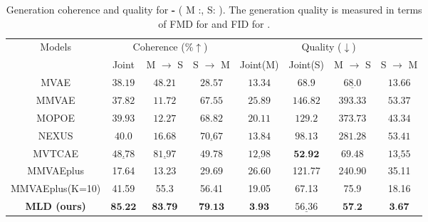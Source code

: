 \begin{table}[h]
\caption{Generation coherence and quality for \textbf{\mnist-\svhn} ( M :\mnist, S: \svhn ). The generation quality is measured in terms of \gls{FMD}  for \mnist and \gls{FID} for \svhn.}
\centering
\tiny
\begin{tabular}{c|c|cc|cc|cc}
\toprule
\multirow{2}{*}{ Models }  & \multicolumn{3}{c}{Coherence (\%$\uparrow$) } &   \multicolumn{4}{c}{Quality ($\downarrow$)} \\
    \cmidrule{2-8}
    & Joint &  M $\rightarrow$ S & S $\rightarrow$ M &
     Joint(M)  &  Joint(S) &M $\rightarrow$ S &  S $\rightarrow$ M  \\
    \midrule
     \gls{MVAE} &  
     $38.19$ &
     $48.21$  &
     $ 28.57$ & 
     $13.34$ &
     $68.9$   & 
     $ \underline{68.0}  $ &
     $ 13.66 $ 
    
     \\
    \gls{MMVAE} &  $37.82$ & $11.72$ & $ 67.55$ & $25.89$ &
    $ 146.82  $& $393.33$  &
    $ 53.37 $ 
 
    \\
    \gls{MOPOE} & $ 39.93$ & $12.27$ & $68.82$ &$20.11$ &
    $ 129.2  $&$373.73$&
    $ 43.34 $
        \\

    \gls{NEXUS} &  $ 40.0$ & $16.68$ & $\underline{70.67}$ &  $13.84$ &
        $ 98.13  $ &$281.28$&
 $ 53.41 $
   \\


    \gls{MVTCAE} & $\underline{48.78} $& $\underline{81.97}$ & $49.78 $&$\underline{12.98}$ &
    $ \textbf{52.92} $&$69.48$ &
    $ \underline{13.55} $ 
\\ 
\gls{MMVAEplus} &17.64 &13.23 & 29.69 &26.60 & 121.77 & 240.90&35.11
\\
  \gls{MMVAEplus}(K=10) & 41.59 & 55.3
& 56.41 & 19.05 & 67.13 & 75.9 & 18.16






      \\
     
    \midrule
    \textbf{\gls{MLD} (ours)}  & $\textbf{85.22}$ & 
    $\textbf{83.79} $&
    $ \textbf{79.13}$ &
    $\textbf{3.93}$ &
    $\underline{56.36}$   &
    $\textbf{57.2}$  &
    $\textbf{3.67} $ 
    \\
    \bottomrule
   
\end{tabular}
\label{coh_quality:ms}
\end{table}




